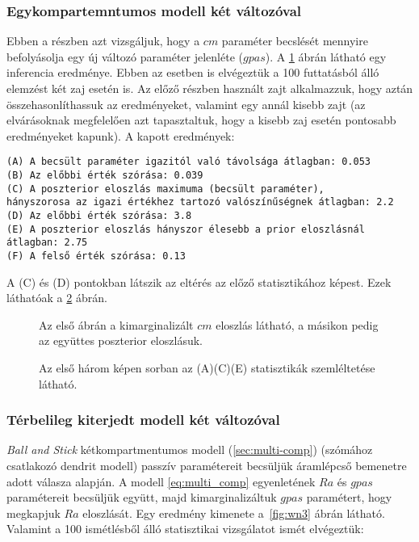 \subsubsection{Egykompartemntumos modell két változóval}
Ebben a részben azt vizsgáljuk, hogy a $cm$ paraméter becslését mennyire befolyásolja egy új változó paraméter jelenléte ($gpas$).
A \ref{fig:wn2} ábrán látható egy inferencia eredménye. Ebben az esetben is elvégeztük a 100 futtatásból álló elemzést két zaj esetén is. Az előző részben használt zajt alkalmazzuk, hogy aztán összehasonlíthassuk az eredményeket, valamint egy annál kisebb zajt (az elvárásoknak megfelelően azt tapasztaltuk, hogy a kisebb zaj esetén pontosabb eredményeket kapunk). A kapott eredmények:
\begin{verbatim}
(A) A becsült paraméter igazitól való távolsága átlagban: 0.053
(B) Az előbbi érték szórása: 0.039
(C) A poszterior eloszlás maximuma (becsült paraméter), 
hányszorosa az igazi értékhez tartozó valószínűségnek átlagban: 2.2
(D) Az előbbi érték szórása: 3.8
(E) A poszterior eloszlás hányszor élesebb a prior eloszlásnál átlagban: 2.75
(F) A felső érték szórása: 0.13
\end{verbatim}
A (C) és (D) pontokban látszik az eltérés az előző statisztikához képest. Ezek láthatóak a \ref{fig:wn2-stat} ábrán.

\begin{figure}
	\hfill
	\hfill
	\hfill
	\caption[Egykompartmentumos, fehér zaj, két paraméteres becslés]{Az első ábrán a kimarginalizált $cm$ eloszlás látható, a másikon pedig az együttes poszterior eloszlásuk. }%
	\label{fig:wn2}
\end{figure}

\begin{figure}
	\hfill
	\hfill
	\hfill
	\vfill
	\caption[Egykompartmentum, fehér zaj, két paraméter statisztika]{Az első három képen sorban az (A)(C)(E) statisztikák szemléltetése látható.}%
	\label{fig:wn2-stat}
\end{figure}

\FloatBarrier
\subsubsection{Térbelileg kiterjedt modell két változóval}
\textit{Ball and Stick} kétkompartmentumos modell (\ref{sec:multi-comp}) (szómához csatlakozó dendrit modell) passzív paramétereit becsüljük áramlépcső bemenetre adott válasza alapján. A modell \ref{eq:multi_comp} egyenletének $Ra$ és $gpas$ paramétereit becsüljük együtt, majd kimarginalizáltuk $gpas$ paramétert, hogy megkapjuk $Ra$ eloszlását. Egy eredmény kimenete a~\ref{fig:wn3} ábrán látható. Valamint a 100 ismétlésből álló statisztikai vizsgálatot ismét elvégeztük:

